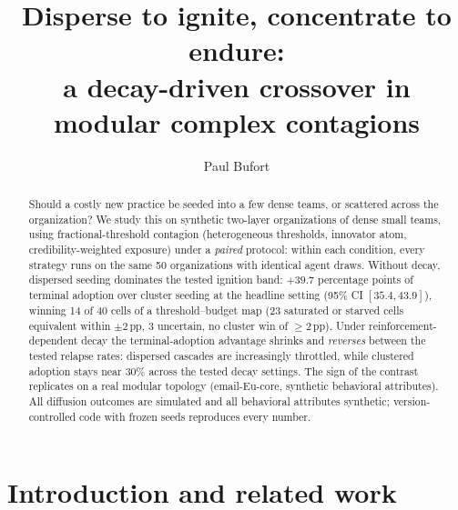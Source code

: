 \documentclass{llncs}
\begin{document}
\title{Disperse to ignite, concentrate to endure:\\
a decay-driven crossover in modular complex contagions}
\author{Paul Bufort}

\maketitle

\begin{abstract}
Should a costly new practice be seeded into a few dense teams, or scattered
across the organization? We study this on synthetic two-layer organizations
of dense small teams, using fractional-threshold contagion (heterogeneous
thresholds, innovator atom, credibility-weighted exposure) under a
\emph{paired} protocol: within each condition, every strategy runs on the
same 50 organizations with identical agent draws. Without decay, dispersed
seeding dominates the tested ignition band: $+39.7$ percentage points
of terminal adoption over cluster seeding at the headline setting (95\% CI
$[35.4, 43.9]$), winning 14 of 40 cells of a threshold--budget map (23
saturated or starved cells equivalent within $\pm2$\,pp, 3 uncertain, no
cluster win of ${\ge}2$\,pp). Under
reinforcement-dependent decay the terminal-adoption advantage shrinks
and \emph{reverses} between the tested relapse rates: dispersed cascades are
increasingly throttled, while clustered adoption stays near 30\% across the
tested decay settings. The sign of the contrast replicates on a real modular topology
(email-Eu-core, synthetic behavioral attributes). All diffusion outcomes are
simulated and all behavioral attributes synthetic; version-controlled code
with frozen seeds reproduces every number.
\end{abstract}

\section{Introduction and related work}
\end{document}
